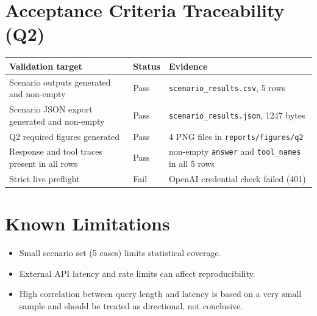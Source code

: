 \documentclass[12pt,a4paper]{article}
\begin{document}
\section{Acceptance Criteria Traceability (Q2)}
\begin{longtable}{@{}p{} p{} p{}@{}}
\toprule
Validation target & Status & Evidence \\
\midrule
Scenario outputs generated and non-empty & Pass & \texttt{scenario\_results.csv}, 5 rows \\
Scenario JSON export generated and non-empty & Pass & \texttt{scenario\_results.json}, 1247 bytes \\
Q2 required figures generated & Pass & 4 PNG files in \texttt{reports/figures/q2} \\
Response and tool traces present in all rows & Pass & non-empty \texttt{answer} and \texttt{tool\_names} in all 5 rows \\
Strict live preflight & Fail & OpenAI credential check failed (401) \\
\bottomrule
\end{longtable}

\section{Known Limitations}
\begin{itemize}
\item Small scenario set (5 cases) limits statistical coverage.
\item External API latency and rate limits can affect reproducibility.
\item High correlation between query length and latency is based on a very small sample and should be treated as directional, not conclusive.
\end{itemize}
\end{document}
